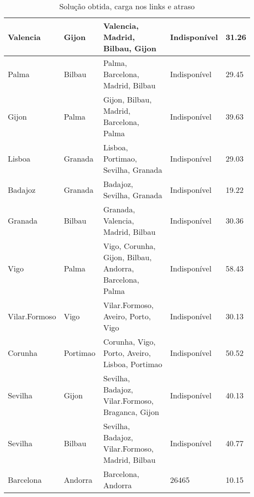 \begin{table}[!htb]
{\begin{tabular}{|l|l|l|l|l|}
Valencia & Gijon & Valencia, Madrid, Bilbau, Gijon & Indisponível & 31.26 \\ \hline
Palma & Bilbau & Palma, Barcelona, Madrid, Bilbau & Indisponível & 29.45 \\ \hline
Gijon & Palma & Gijon, Bilbau, Madrid, Barcelona, Palma & Indisponível & 39.63 \\ \hline
Lisboa & Granada & Lisboa, Portimao, Sevilha, Granada & Indisponível & 29.03 \\ \hline
Badajoz & Granada & Badajoz, Sevilha, Granada & Indisponível & 19.22 \\ \hline
Granada & Bilbau & Granada, Valencia, Madrid, Bilbau & Indisponível & 30.36 \\ \hline
Vigo & Palma & Vigo, Corunha, Gijon, Bilbau, Andorra, Barcelona, Palma & Indisponível & 58.43 \\ \hline
Vilar.Formoso & Vigo & Vilar.Formoso, Aveiro, Porto, Vigo & Indisponível & 30.13 \\ \hline
Corunha & Portimao & Corunha, Vigo, Porto, Aveiro, Lisboa, Portimao & Indisponível & 50.52 \\ \hline
Sevilha & Gijon & Sevilha, Badajoz, Vilar.Formoso, Braganca, Gijon & Indisponível & 40.13 \\ \hline
Sevilha & Bilbau & Sevilha, Badajoz, Vilar.Formoso, Madrid, Bilbau & Indisponível & 40.77 \\ \hline
Barcelona & Andorra & Barcelona, Andorra & 26465 & 10.15 \\ \hline
\end{tabular}}
\caption[]{Solução obtida, carga nos links e atraso}
\end{table}


